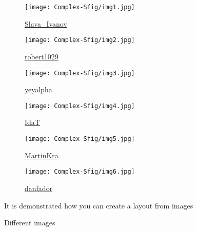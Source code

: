 \begin{figure}
    \centering
    \begin{subfigure}[b]{0.3\textwidth}
        \centering
        \texttt{[image: Complex-Sfig/img1.jpg]}
        \caption[Space Art]{\href{https://pixabay.com/illustrations/space-art-space-abstract-galaxy-5626853/}{Slava\_Ivanov}}
    \end{subfigure}
    \begin{subfigure}[b]{0.3\textwidth}
        \centering
        \texttt{[image: Complex-Sfig/img2.jpg]}
        \caption[Template]{\href{https://pixabay.com/photos/background-colour-template-contrast-5074889/}{robert1029}}
    \end{subfigure}
    \begin{subfigure}[b]{0.3\textwidth}
        \centering
        \texttt{[image: Complex-Sfig/img3.jpg]}
        \caption[City]{\href{https://pixabay.com/photos/city-night-bird-s-eye-view-5644601/}{yeyalpha}}
    \end{subfigure}
    \begin{subfigure}[b]{0.5\textwidth}
        \centering
        \texttt{[image: Complex-Sfig/img4.jpg]}
        \caption[Mountains]{\href{https://pixabay.com/photos/italy-mountains-sunrise-nature-6728318/}{IdaT}}
    \end{subfigure}
    \newline
    \begin{subfigure}[b]{0.3\textwidth}
        \centering
        \texttt{[image: Complex-Sfig/img5.jpg]}
        \caption[Road]{\href{https://pixabay.com/photos/road-highway-sea-mountains-coast-6597404/}{MartinKra}}
    \end{subfigure}
    \begin{subfigure}[b]{0.6\textwidth}
        \centering
        \texttt{[image: Complex-Sfig/img6.jpg]}
        \caption[Mountains]{\href{https://pixabay.com/photos/mountains-sun-clouds-peak-summit-190055/}{danfador}}
    \end{subfigure}
    \caption{Different images}
    \label{fig:f2-float}
    \small
        It is demonstrated how you can create a layout from images
\end{figure}
